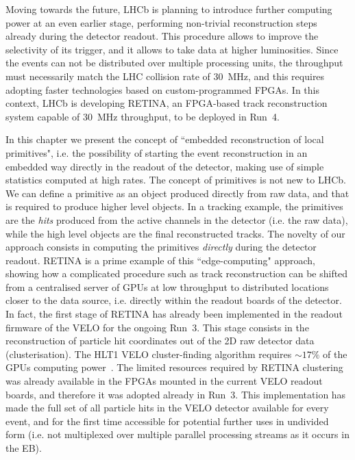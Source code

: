 Moving towards the future, LHCb is planning to introduce further computing power at an even earlier stage, performing non-trivial reconstruction steps already during the detector readout. This procedure allows to improve the selectivity of its trigger, and it allows to take data at higher luminosities. 
Since the events can not be distributed over multiple processing units, the throughput must necessarily match the LHC collision rate of \SI{30}{\mega\hertz}, and this requires adopting faster technologies based on custom-programmed FPGAs.
In this context, LHCb is developing RETINA, an FPGA-based track reconstruction system capable of \SI{30}{\mega\hertz} throughput, to be deployed in Run~4\cite{Morello:2888549}. 

In this chapter we present the concept of ``embedded reconstruction of local primitives", i.e. the possibility of starting the event reconstruction in an embedded way directly in the readout of the detector, making use of simple statistics computed at high rates. The concept of primitives is not new to LHCb. We can define a primitive as an object produced directly from raw data, and that is required to produce higher level objects. In a tracking example, the primitives are the \textit{hits} produced from the active channels in the detector (i.e. the raw data), while the high level objects are the final reconstructed tracks. 
The novelty of our approach consists in computing the primitives \textit{directly} during the detector readout. RETINA is a prime example of this ``edge-computing"  approach, showing how a complicated procedure such as track reconstruction can be shifted from a centralised server of GPUs at low throughput to distributed locations closer to the data source, i.e. directly within the readout boards of the detector.
In fact, the first stage of RETINA has already been implemented in the readout firmware of the VELO for the ongoing Run~3. This stage consists in the reconstruction of particle hit coordinates out of the 2D raw detector data (clusterisation). The HLT1 VELO cluster-finding algorithm requires $\sim 17\%$ of the GPUs computing power~\cite{Bassi_2023}. The limited resources required by RETINA clustering was already available in the FPGAs mounted in the current VELO readout boards, and therefore it was adopted already in Run~3.
This implementation has made the full set of all particle hits in the VELO detector available for every event, and for the first time accessible for potential further uses in undivided form (i.e. not multiplexed over multiple parallel processing streams as it occurs in the EB).

